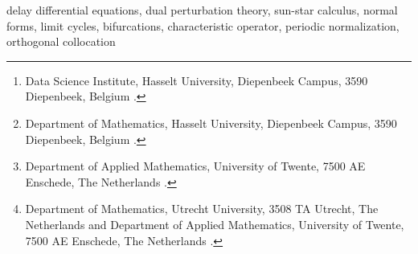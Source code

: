 \documentclass[english]{myarticle}
\title{\TheTitle}
\author{Maikel M. Bosschaert\thanks{Data Science Institute, Hasselt University, Diepenbeek Campus, 3590 Diepenbeek, Belgium \email{(maikel.bosschaert@uhasselt.be)}.}
	\and Bram Lentjes\thanks{Department of Mathematics, Hasselt University, Diepenbeek Campus, 3590 Diepenbeek, Belgium \email{(bram.lentjes@uhasselt.be)}.}
	\and Len Spek\thanks{Department of Applied Mathematics, University of Twente, 7500 AE Enschede, The Netherlands \email{(l.spek@utwente.nl)}.}
	\and Yuri A. Kuznetsov\thanks{Department of Mathematics, Utrecht University, 3508 TA Utrecht, The Netherlands and Department of Applied Mathematics, University of Twente, 7500 AE Enschede, The Netherlands \email{(i.a.kouznetsov@uu.nl)}.}
}
\begin{document}
\maketitle

\begin{abstract}
Recent work in \cite{Article1,Article2} by the authors on periodic center manifolds and normal forms for bifurcations of limit cycles in delay differential equations (DDEs) motivates the derivation of explicit computational formulas for the critical normal form coefficients of all codimension one bifurcations of limit cycles. In this paper, we derive such formulas via an application of the periodic normalization method in combination with the functional analytic perturbation framework for dual
semigroups (sun-star calculus). The explicit formulas allow us to distinguish between nondegenerate, sub- and supercritical bifurcations. To efficiently apply these formulas, we introduce the characteristic operator as this enables us to use robust numerical boundary-value algorithms based on orthogonal collocation. Although our theoretical results are proven in a more general setting, the software implementation and examples focus on discrete DDEs. The actual implementation is described in detail and its effectiveness is demonstrated on various models.
\end{abstract}

\begin{keywords}
delay differential equations, dual perturbation theory, sun-star calculus, normal forms, limit cycles, bifurcations, characteristic operator, periodic normalization, orthogonal collocation
\end{keywords}
\end{document}
